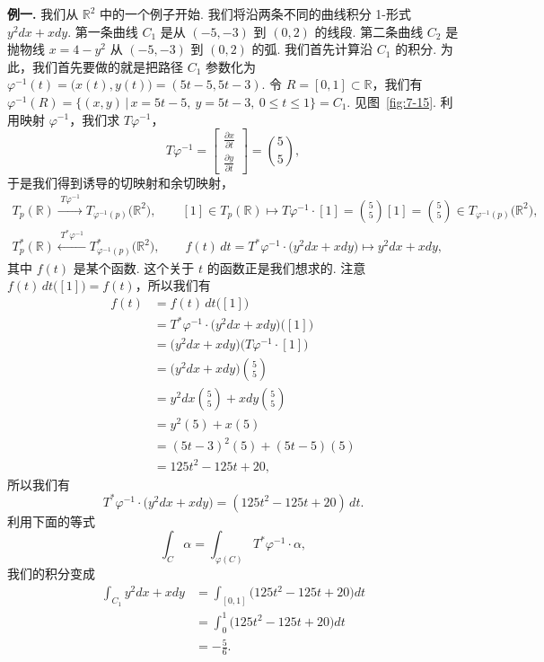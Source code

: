 \textbf{例一.} 我们从 $\mathbb{R}^2$ 中的一个例子开始. 我们将沿两条不同的曲线积分 1-形式 $y^2dx+xdy$. 第一条曲线 $C_1$ 是从 $(-5,-3)$ 到 $(0,2)$ 的线段. 第二条曲线 $C_2$ 是抛物线 $x=4-y^2$ 从 $(-5,-3)$ 到 $(0,2)$ 的弧. 我们首先计算沿 $C_1$ 的积分. 为此，我们首先要做的就是把路径 $C_1$ 参数化为 $\varphi^{-1}(t)=\bigl(x(t),y(t)\bigr)=(5t-5,5t-3)$. 令 $R=[0,1]\subset\mathbb{R}$，我们有 $\varphi^{-1}(R)=\bigl\{(x,y)\,\bigl|\,x=5t-5,\ y=5t-3,\ 0\leq t\leq 1\bigr\}=C_1$. 见图~\ref{fig:7-15}. 利用映射 $\varphi^{-1}$，我们求 $T\varphi^{-1}$，
\[
T\varphi^{-1}=\begin{bmatrix}\frac{\partial x}{\partial t}\\\frac{\partial y}{\partial t}\end{bmatrix}=\binom{5}{5},
\]
于是我们得到诱导的切映射和余切映射，
\begin{align*}
T_p(\mathbb{R})\xrightarrow{\;T\varphi^{-1}\;}T_{\varphi^{-1}(p)}\bigl(\mathbb{R}^2\bigr),\qquad[1]\in T_p(\mathbb{R})\longmapsto T\varphi^{-1}\cdot[1]=\binom{5}{5}[1]=\binom{5}{5}\in T_{\varphi^{-1}(p)}\bigl(\mathbb{R}^2\bigr), \\
T^*_p(\mathbb{R})\xleftarrow{\;T^*\varphi^{-1}\;}T^*_{\varphi^{-1}(p)}\bigl(\mathbb{R}^2\bigr),\qquad f(t)\,dt=T^*\varphi^{-1}\cdot\bigl(y^2dx+xdy\bigr)\longmapsto y^2dx+xdy,
\end{align*}
其中 $f(t)$ 是某个函数. 这个关于 $t$ 的函数正是我们想求的. 注意 $f(t)\,dt\bigl([1]\bigr)=f(t)$，所以我们有
\begin{align*}
f(t)&=f(t)\,dt\bigl([1]\bigr)\\
&=T^*\varphi^{-1}\cdot\bigl(y^2dx+xdy\bigr)\bigl([1]\bigr)\\
&=\bigl(y^2dx+xdy\bigr)\bigl(T\varphi^{-1}\cdot[1]\bigr)\\
&=\bigl(y^2dx+xdy\bigr)\binom{5}{5}\\
&=y^2dx\binom{5}{5}+xdy\binom{5}{5}\\
&=y^2(5)+x(5)\\
&=(5t-3)^2(5)+(5t-5)(5)\\
&=125t^2-125t+20,
\end{align*}
所以我们有
\[
T^*\varphi^{-1}\cdot\bigl(y^2dx+xdy\bigr)=(125t^2-125t+20)\,dt.
\]
利用下面的等式
\[
\int_C\alpha=\int_{\varphi(C)}T^*\varphi^{-1}\cdot\alpha,
\]
我们的积分变成
\begin{align*}
\int_{C_1}y^2dx+xdy
&=\int_{[0,1]}\bigl(125t^2-125t+20\bigr)dt\\
&=\int_0^1\bigl(125t^2-125t+20\bigr)dt\\
&=-\frac{5}{6}.
\end{align*}

